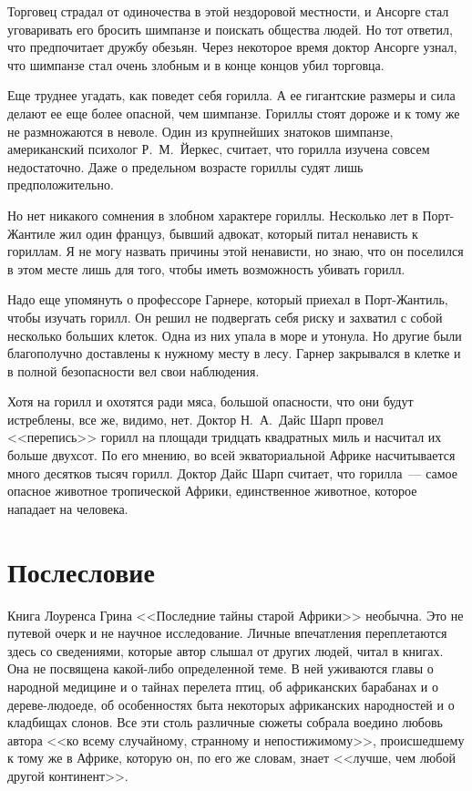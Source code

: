 \documentclass[12pt,a4paper,twoside,openany,svgnames]{memoir}
\begin{document}
Торговец страдал от одиночества в этой нездоровой местности, и Ансорге стал уговаривать его бросить шимпанзе и поискать общества людей. Но тот ответил, что предпочитает дружбу обезьян. Через некоторое время доктор Ансорге узнал, что шимпанзе стал очень злобным и в конце концов убил торговца.

Еще труднее угадать, как поведет себя горилла. А ее гигантские размеры и сила делают ее еще более опасной, чем шимпанзе. Гориллы стоят дороже и к тому же не размножаются в неволе. Один из крупнейших знатоков шимпанзе, американский психолог Р.~М.~Йеркес, считает, что горилла изучена совсем недостаточно. Даже о предельном возрасте гориллы судят лишь предположительно.

Но нет никакого сомнения в злобном характере гориллы. Несколько лет в Порт-Жантиле жил один француз, бывший адвокат, который питал ненависть к гориллам. Я не могу назвать причины этой ненависти, но знаю, что он поселился в этом месте лишь для того, чтобы иметь возможность убивать горилл.

Надо еще упомянуть о профессоре Гарнере, который приехал в Порт-Жантиль, чтобы изучать горилл. Он решил не подвергать себя риску и захватил с собой несколько больших клеток. Одна из них упала в море и утонула. Но другие были благополучно доставлены к нужному месту в лесу. Гарнер закрывался в клетке и в полной безопасности вел свои наблюдения.

Хотя на горилл и охотятся ради мяса, большой опасности, что они будут истреблены, все же, видимо, нет. Доктор Н.~А.~Дайс Шарп провел <<перепись>> горилл на площади тридцать квадратных миль и насчитал их больше двухсот. По его мнению, во всей экваториальной Африке насчитывается много десятков тысяч горилл. Доктор Дайс Шарп считает, что горилла~--- самое опасное животное тропической Африки, единственное животное, которое нападает на человека.

\chapter*{Послесловие}

Книга Лоуренса Грина <<Последние тайны старой Африки>> необычна. Это не путевой очерк и не научное исследование. Личные впечатления переплетаются здесь со сведениями, которые автор слышал от других людей, читал в книгах. Она не посвящена какой-либо определенной теме. В ней уживаются главы о народной медицине и о тайнах перелета птиц, об африканских барабанах и о дереве-людоеде, об особенностях быта некоторых африканских народностей и о кладбищах слонов. Все эти столь различные сюжеты собрала воедино любовь автора <<ко всему случайному, странному и непостижимому>>, происшедшему к тому же в Африке, которую он, по его же словам, знает <<лучше, чем любой другой континент>>.
\end{document}
